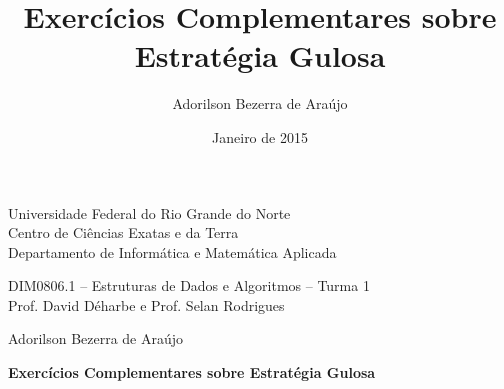 \documentclass[12pt]{article}
\title{Exercícios Complementares sobre Estratégia Gulosa}
\author{Adorilson Bezerra de Araújo}
\date{Janeiro de 2015}
\begin{document}
\begin{center}
{\large\sc Universidade Federal do Rio Grande do Norte} \\
{\large\sc Centro de Ciências Exatas e da Terra} \\
{\large\sc Departamento de Informática e Matemática Aplicada}

\vspace*{0.5cm}

{\sc DIM0806.1 -- Estruturas de Dados e Algoritmos -- Turma 1}\\
{\sc Prof. David Déharbe e Prof. Selan Rodrigues}

\vspace*{0.2cm}

{\sc Adorilson Bezerra de Araújo}

\vspace*{0.2cm}

{\bf Exercícios Complementares sobre Estratégia Gulosa}
\end{center}


\end{document}
